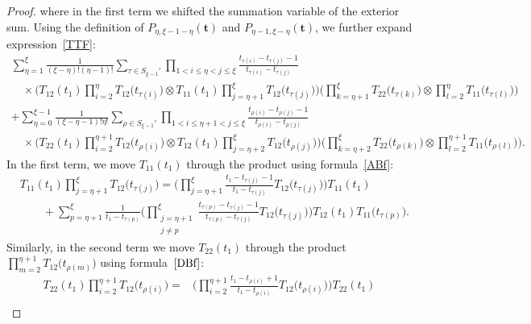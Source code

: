 \documentclass[10pt,a4paper]{amsart}
\numberwithin{equation}{section}
\begin{document}
\begin{proof}
\pagebreak

\noindent
where in the first term we shifted the summation variable of the exterior sum.
Using the definition of $P_{\eta,\xi-1-\eta}(\boldsymbol{t}) $ and $P_{\eta-1,\xi-\eta}(\boldsymbol{t}) $, we further expand expression~\eqref{TTF}:
\begin{gather*}
\sum_{\eta=1}^{\xi} \frac{1}{(\xi-\eta)!(\eta-1)! } \sum_{\tau\in S_{\xi-1}'} \prod_{1< i\leq\eta<j \leq \xi} \frac{t_{\tau(i)}-t_{\tau(j)}-1}{t_{\tau(i)}-t_{\tau(j)}} \\[1mm]
\quad\times \Biggl(T_{12}(t_1) \prod_{i=2}^{\eta} T_{12} \bigl(t_{\tau(i)}\bigr) \otimes T_{11}(t_1)\prod_{j=\eta+1}^{\xi} T_{12} \bigl(t_{\tau(j)}\bigr) \Biggr) \Biggl(\prod_{k=\eta+1}^{\xi } T _{22}\bigl(t_{\tau(k)}\bigr)\otimes \prod_{l=2}^{\eta} T _{11}\bigl(t_{\tau(l)}\bigr)\Biggr) \\[1mm]
 + \sum_{\eta=0}^{\xi-1} \frac{1}{(\xi-\eta-1) ! \eta!} \sum_{\rho\in S_{\xi-1}'} \prod_{1< i\leq\eta+1<j \leq \xi} \frac{t_{\rho(i)}-t_{\rho(j)}-1}{t_{\rho(i)}-t_{\rho(j)}} \\[1mm]
\quad\times \Biggl(T_{22}(t_1) \prod_{i=2}^{\eta+1} T_{12} \bigl(t_{\rho(i)}\bigr) \otimes T_{12}(t_1)\prod_{j=\eta+2}^{\xi } T_{12} \bigl(t_{\rho(j)}\bigr) \Biggr)
\Biggl(\prod_{k=\eta+2}^{\xi } T _{22}\bigl(t_{\rho(k)}\bigr)\otimes \prod_{l=2}^{\eta+1} T _{11}\bigl(t_{\rho(l)}\bigr)\Biggr).
\end{gather*}
In the first term, we move $T_{11}(t_1)$ through the product  using formula~\eqref{ABf}:
\begin{align*}
&T_{11} (t_1)\prod_{j=\eta+1}^{\xi } T_{12} \bigl(t_{\tau(j)}\bigr)=\Biggl( \prod_{j=\eta+1}^{\xi } \frac{t_1-t_{\tau(j)}-1}{t_1-t_{\tau(j)}} T_{12} \bigl(t_{\tau(j)}\bigr)\Biggr) T_{11} (t_1) \\[1mm]
&\qquad{}+\sum_{p=\eta+1}^\xi \frac{1}{t_1-t_{\tau(p)}}\Biggl( \prod_{\substack{j=\eta+1\\j\neq p}}^\xi \frac{t_{\tau(p)}-t_{\tau(j)}-1}{t_{\tau(p)}-t_{\tau(j)}} T_{12} \bigl(t_{\tau(j)}\bigr)\Biggr) T_{12} (t_1)T_{11} \bigl(t_{\tau(p)}\bigr).
\end{align*}
Similarly, in the second term we move $T_{22}(t_1)$ through the product $\prod_{m=2}^{\eta+1} T_{12} \bigl(t_{\rho(m)}\bigr)$ using formula~$\eqref{DBf}$:
\begin{align*}
T_{22} (t_1)\prod_{i=2}^{\eta+1 } T_{12} \bigl(t_{\rho(i)}\bigr)={}&\Biggl( \prod_{i=2}^{\eta+1}\frac{t_1-t_{\rho(i)}+1}{t_1-t_{\rho(i)}} T_{12} \bigl(t_{\rho(i)}\bigr)\Biggr) T_{22} (t_1)\\[1mm]

\end{align*}
\end{proof}
\end{document}
